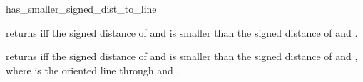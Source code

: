 \begin{ccRefFunction}{has_smaller_signed_dist_to_line}

          {returns  iff the signed distance of 
           and  is smaller than the signed distance of 
            and .}

          {returns  iff the signed distance of 
           and  is smaller than the signed distance of 
            and , where  is the 
           oriented line through  and .}
\end{ccRefFunction}

